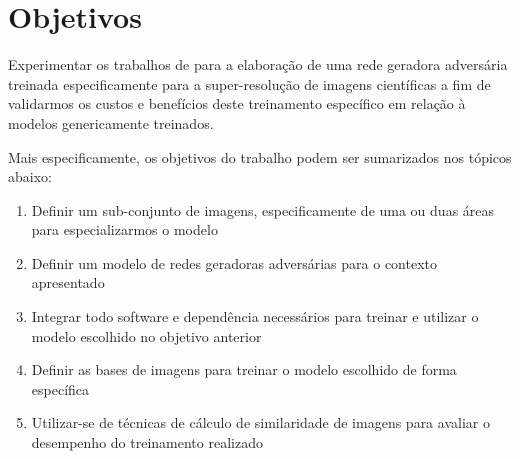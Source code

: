 \section{Objetivos}

Experimentar os trabalhos de  para a elaboração de uma rede geradora adversária treinada especificamente para a super-resolução de imagens científicas a fim de validarmos os custos e benefícios deste treinamento específico em relação à modelos genericamente treinados.

Mais especificamente, os objetivos do trabalho podem ser sumarizados nos tópicos abaixo:

\begin{enumerate}

    \item Definir um sub-conjunto de imagens, especificamente de uma ou duas áreas para especializarmos o modelo

    \item Definir um modelo de redes geradoras adversárias para o contexto apresentado
	
    \item Integrar todo software e dependência necessários para treinar e utilizar o modelo escolhido no objetivo anterior
    
	\item Definir as bases de imagens para treinar o modelo escolhido de forma específica
	
	\item Utilizar-se de técnicas de cálculo de similaridade de imagens para avaliar o desempenho do treinamento realizado

\end{enumerate}
 
